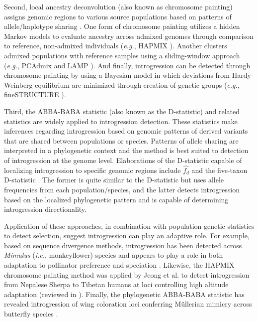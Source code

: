 \documentclass[11pt]{article}
\begin{document}
Second, local ancestry deconvolution (also known as chromosome painting) assigns genomic regions to various source populations based on patterns of allele/haplotype sharing \cite{schraiber2015}. 
One form of chromosome painting utilizes a hidden Markov models to evaluate ancestry across admixed genomes through comparison to reference, non-admixed individuals (\emph{e.g.}, HAPMIX \cite{Price2009}). 
Another clusters admixed populations with reference samples using a sliding-window approach (\emph{e.g.}, PCAdmix \cite{brisbin2012pcadmix} and LAMP \cite{sankararaman2008}).
And finally, introgression can be detected through chromosome painting by using a Bayesian model \cite{pritchard2000} in which deviations from Hardy-Weinberg equilibrium are minimized through creation of genetic groups (\emph{e.g.}, fineSTRUCTURE \cite{Lawson2012}). 


Third, the ABBA-BABA statistic (also known as the D-statistic) and related statistics are widely applied to introgression detection.
These statistics make inferences regarding introgression based on genomic patterns of derived variants that are shared between populations or species.
Patterns of allele sharing are interpreted in a phylogenetic context and the method is best suited to detection of introgression at the genome level.
Elaborations of the D-statistic capable of localizing introgression to specific genomic regions include $\hat{f_{d}}$ \cite{martin2015} and the five-taxon D-statistic \cite{pease2015}.
The former is quite similar to the D-statistic but uses allele frequencies from each population/species, and the latter detects introgression based on the localized phylogenetic pattern and is capable of determining introgression directionality.


Application of these approaches, in combination with population genetic statistics to detect selection, suggest introgression can play an adaptive role.
For example, based on sequence divergence methods, introgression has been detected across \emph{Mimulus} (\emph{i.e.}, monkeyflower) species and appears to play a role in both adaptation to pollinator preference and speciation \cite{Stankowski2015}.
Likewise, the HAPMIX chromosome painting method was applied by Jeong et al. \cite{jeong2014} to detect introgression from Nepalese Sherpa to Tibetan humans at loci controlling high altitude adaptation (reviewed in \cite{Racimo2015}).
Finally, the phylogenetic ABBA-BABA statistic has revealed introgression of wing coloration loci conferring M\"{u}llerian mimicry across butterfly species \cite{heliconius2012}.
\end{document}
